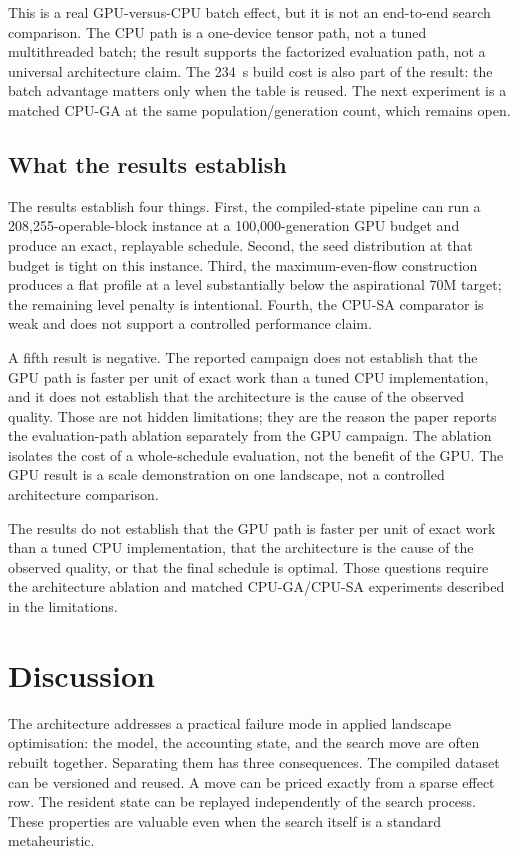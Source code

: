 \documentclass[11pt]{article}
\begin{document}
This is a real GPU-versus-CPU batch effect, but it is not an end-to-end search comparison. The CPU
path is a one-device tensor path, not a tuned multithreaded batch; the result supports the factorized
evaluation path, not a universal architecture claim. The 234~s build cost is also part of the
result: the batch advantage matters only when the table is reused. The next experiment is a matched
CPU-GA at the same population/generation count, which remains open.
\subsection{What the results establish}

The results establish four things. First, the compiled-state pipeline can run a
208,255-operable-block instance at a 100,000-generation GPU budget and produce an
exact, replayable schedule. Second, the seed distribution at that budget is
tight on this instance. Third, the maximum-even-flow construction produces a
flat profile at a level substantially below the aspirational 70M target; the
remaining level penalty is intentional. Fourth, the CPU-SA comparator is weak
and does not support a controlled performance claim.

A fifth result is negative. The reported campaign does not establish that the
GPU path is faster per unit of exact work than a tuned CPU implementation, and
it does not establish that the architecture is the cause of the observed
quality. Those are not hidden limitations; they are the reason the paper reports
the evaluation-path ablation separately from the GPU campaign. The ablation
isolates the cost of a whole-schedule evaluation, not the benefit of the GPU.
The GPU result is a scale demonstration on one landscape, not a controlled
architecture comparison.

The results do not establish that the GPU path is faster per unit of exact work
than a tuned CPU implementation, that the architecture is the cause of the
observed quality, or that the final schedule is optimal. Those questions require
the architecture ablation and matched CPU-GA/CPU-SA experiments described in
the limitations.

\section{Discussion}\label{discussion}

The architecture addresses a practical failure mode in applied landscape
optimisation: the model, the accounting state, and the search move are often
rebuilt together. Separating them has three consequences. The compiled dataset
can be versioned and reused. A move can be priced exactly from a sparse effect
row. The resident state can be replayed independently of the search process.
These properties are valuable even when the search itself is a standard
metaheuristic.
\end{document}
